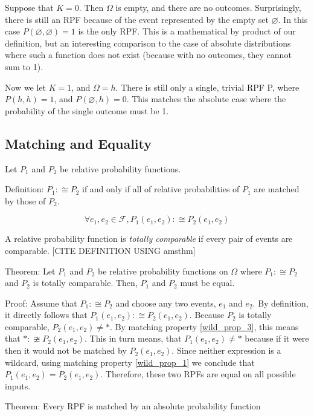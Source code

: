 \documentclass[twoside]{article}
\begin{document}
Suppose that \(K = 0\). Then \(\Omega\) is empty, and there are no outcomes. Surprisingly, there is still an RPF because of the event represented by the empty set \(\varnothing\). In this case \(P(\varnothing, \varnothing) = 1\) is the only RPF. This is a mathematical by product of our definition, but an interesting comparison to the case of absolute distributions where such a function does not exist (because with no outcomes, they cannot sum to 1).

Now we let \(K = 1\), and \(\Omega = {h}\). There is still only a single, trivial RPF P, where \(P(h, h) = 1\), and \(P(\varnothing, h) = 0\). This matches the absolute case where the probability of the single outcome must be 1.

\subsection{Matching and Equality}

Let \(P_1\) and \(P_2\) be relative probability functions. 

Definition: \(P_1 :\cong P_2\) if and only if all of relative probabilities of \(P_1\) are matched by those of \(P_2\).

\begin{equation}
\forall e_1, e_2 \in \mathcal{F}, P_1(e_1, e_2) :\cong P_2(e_1, e_2)
\end{equation}

A relative probability function is \textit{totally comparable} if every pair of events are comparable. [CITE DEFINITION USING amsthm]

Theorem: Let \(P_1\) and \(P_2\) be relative probability functions on \(\Omega\) where \(P_1 :\cong P_2\) and \(P_2\) is totally comparable. Then, \(P_1\) and \(P_2\) must be equal.

Proof: Assume that \(P_1 :\cong P_2\) and choose any two events, \(e_1\) and \(e_2\). By definition, it directly follows that \(P_1(e_1, e_2) :\cong P_2(e_1, e_2)\). Because \(P_2\) is totally comparable, \(P_2(e_1, e_2) \neq \ast\). By matching property \ref{wild_prop_3}, this means that \(\ast :\ncong P_2(e_1, e_2)\). This in turn means, that \(P_1(e_1, e_2) \neq \ast\) because if it were then it would not be matched by \(P_2(e_1, e_2)\). Since neither expression is a wildcard, using matching property \ref{wild_prop_1} we conclude that \(P_1(e_1, e_2) = P_2(e_1, e_2)\). Therefore, these two RPFs are equal on all possible inputs.

Theorem: Every RPF is matched by an absolute probability function
\end{document}

